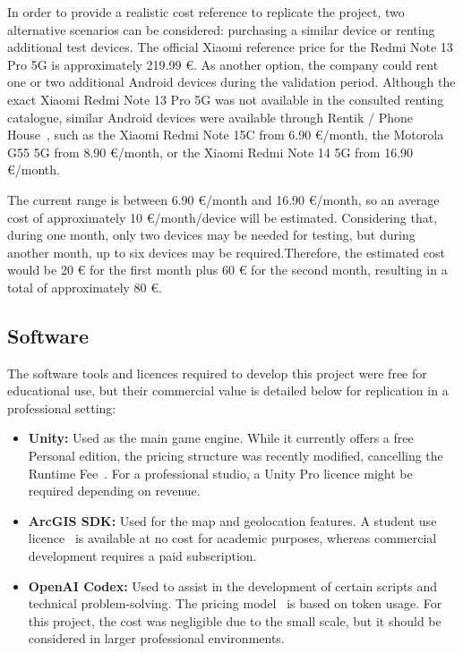 In order to provide a realistic cost reference to replicate the project, two alternative scenarios can be considered: purchasing a similar device or renting additional test devices.
The official Xiaomi reference price for the Redmi Note 13 Pro 5G is approximately 219.99 €. As another option, the company could rent one or two additional Android devices during the validation period. Although the exact Xiaomi Redmi Note 13 Pro 5G was not available in the consulted renting catalogue, similar Android devices were available through Rentik / Phone House~\cite{rentik}, such as the Xiaomi Redmi Note 15C from 6.90 €/month, the Motorola G55 5G from 8.90 €/month, or the Xiaomi Redmi Note 14 5G from 16.90 €/month.

The current range is between 6.90 €/month and 16.90 €/month, so an average cost of approximately 10 €/month/device will be estimated. Considering that, during one month, only two devices may be needed for testing, but during another month, up to six devices may be required.Therefore, the estimated cost would be 20 € for the first month plus 60 € for the second month, resulting in a total of approximately 80 €.


\subsection{Software}
The software tools and licences required to develop this project were free for educational use, but their commercial value is detailed below for replication in a professional setting:
\begin{itemize}
    \item \textbf{Unity:} Used as the main game engine. While it currently offers a free Personal edition, the pricing structure was recently modified, cancelling the Runtime Fee~\cite{unity_pricing}. For a professional studio, a Unity Pro licence might be required depending on revenue.
    \item \textbf{ArcGIS SDK:} Used for the map and geolocation features. A student use licence~\cite{arcgis_license} is available at no cost for academic purposes, whereas commercial development requires a paid subscription.
    \item \textbf{OpenAI Codex:} Used to assist in the development of certain scripts and technical problem-solving. The pricing model~\cite{codex_pricing} is based on token usage. For this project, the cost was negligible due to the small scale, but it should be considered in larger professional environments.
\end{itemize}
